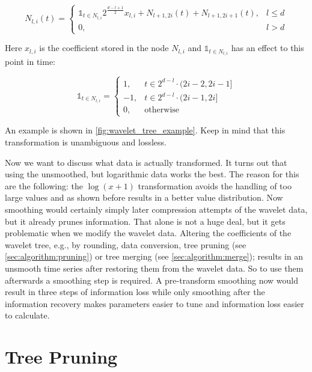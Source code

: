 \begin{equation}\label{eq:node}
    N_{l, i}(t) = \begin{cases}
        \mathbb{1}_{t \in N_{l, i}} 2^\frac{d - l + 1}{2} x_{l, i} + N_{l + 1, 2i}(t) + N_{l + 1, 2i + 1}(t), & l \leq d \\
        0, & l > d
    \end{cases}
\end{equation}

Here $x_{l, i}$ is the coefficient stored in the node $N_{l, i}$ and $\mathbb{1}_{t \in N_{l, i}}$ has an effect to this point in time:

\begin{equation}\label{eq:matches}
    \mathbb{1}_{t \in N_{l, i}} = \begin{cases}
        1, & t \in 2^{d - l} \cdot (2i - 2, 2i - 1 ] \\
        -1, & t \in 2^{d - l} \cdot (2i - 1, 2i ] \\
        0, & \text{otherwise}
    \end{cases}
\end{equation}

An example is shown in \autoref{fig:wavelet_tree_example}. Keep in mind that this transformation is unambiguous and lossless.

Now we want to discuss what data is actually transformed. It turns out that using the unsmoothed, but logarithmic data works the best. The reason for this are the following: the $\log(x + 1)$ transformation avoids the handling of too large values and as shown before results in a better value distribution. Now smoothing would certainly simply later compression attempts of the wavelet data, but it already prunes information. That alone is not a huge deal, but it gets problematic when we modify the wavelet data. Altering the coefficients of the wavelet tree, e.g., by rounding, data conversion, tree pruning (see \autoref{sec:algorithm:pruning}) or tree merging (see \autoref{sec:algorithm:merge}); results in an unsmooth time series after restoring them from the wavelet data. So to use them afterwards a smoothing step is required. A pre-transform smoothing now would result in three steps of information loss while only smoothing after the information recovery makes parameters easier to tune and information loss easier to calculate.



\section{Tree Pruning}
\label{sec:algorithm:pruning}

